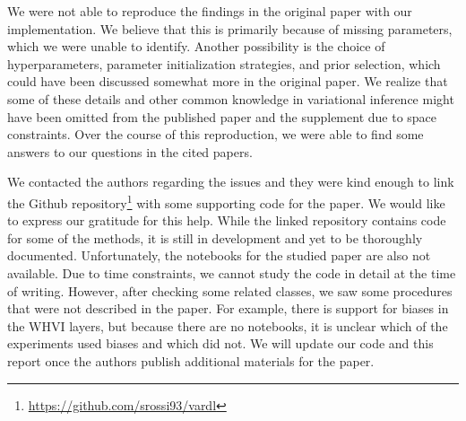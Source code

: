 \documentclass[11pt, twocolumn]{article}
\begin{document}
    We were not able to reproduce the findings in the original paper with our implementation.
    We believe that this is primarily because of missing parameters, which we were unable to identify.
    Another possibility is the choice of hyperparameters, parameter initialization strategies, and prior selection, which could have been discussed somewhat more in the original paper.
    We realize that some of these details and other common knowledge in variational inference might have been omitted from the published paper and the supplement due to space constraints.
    Over the course of this reproduction, we were able to find some answers to our questions in the cited papers.

    We contacted the authors regarding the issues and they were kind enough to link the Github repository\footnote{\url{https://github.com/srossi93/vardl}} with some supporting code for the paper.
    We would like to express our gratitude for this help.
    While the linked repository contains code for some of the methods, it is still in development and yet to be thoroughly documented.
    Unfortunately, the notebooks for the studied paper are also not available.
    Due to time constraints, we cannot study the code in detail at the time of writing.
    However, after checking some related classes, we saw some procedures that were not described in the paper.
    For example, there is support for biases in the WHVI layers, but because there are no notebooks, it is unclear which of the experiments used biases and which did not.
    We will update our code and this report once the authors publish additional materials for the paper.

    
    
\end{document}
